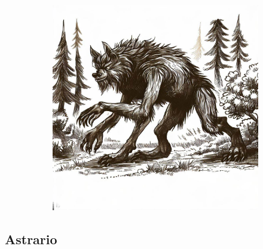 \documentclass[11pt, twoside]{article}
\begin{document}
\begin{figure}[H]
\begin{subfigure}{0.3\textwidth}
  \end{subfigure}%
  \begin{subfigure}{0.3\textwidth}
    \centering
    \includegraphics[width=0.99\linewidth]{wolf3.jpeg}
  \end{subfigure}
\end{figure}

\newpage

\subsection{Astrario}
\label{sec:org4a170bf}
\end{document}
